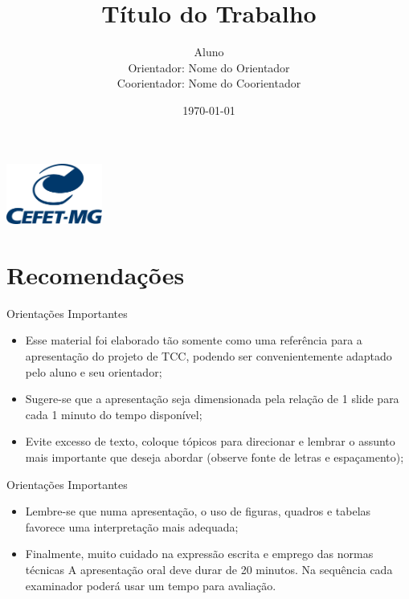 \documentclass{beamer}
\title[Inteligência Artificial]{Título do Trabalho}
\author[Tiago Alves de Oliveira]{Aluno \\Orientador: Nome do Orientador \\Coorientador: Nome do Coorientador}
\date{\today}
\begin{document}
\begin{frame}[plain]
    \begin{center}
        \includegraphics[height=2cm]{Fig/cefetmg.jpg}
    \end{center}
    \titlepage
\end{frame}

\section{Recomendações}
\begin{frame}{Orientações Importantes}
    \begin{itemize}
        \item Esse material foi elaborado tão somente como uma referência para a apresentação do projeto de TCC, podendo ser convenientemente adaptado pelo aluno e seu orientador;
        \item Sugere-se que a apresentação seja dimensionada pela relação de 1 slide para cada 1 minuto do tempo disponível;
        \item Evite excesso de texto, coloque tópicos para direcionar e lembrar o assunto mais importante que deseja abordar (observe fonte de letras e espaçamento);       
    \end{itemize}
\end{frame}

\begin{frame}{Orientações Importantes}
    \begin{itemize}
        \item Lembre-se que numa apresentação, o uso de figuras, quadros e tabelas favorece uma interpretação mais adequada;
        \item Finalmente, muito cuidado na expressão escrita e emprego das normas técnicas A apresentação oral deve durar de 20 minutos. Na sequência cada examinador poderá usar um tempo para avaliação.
    \end{itemize}
\end{frame}
\end{document}
